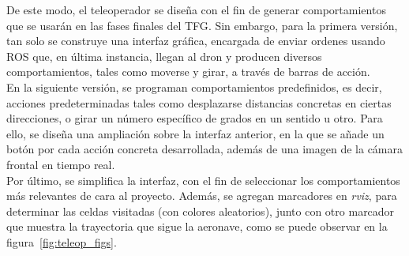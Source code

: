 De este modo, el teleoperador se diseña con el fin de generar comportamientos que se usarán en las fases finales del \ac{TFG}. Sin embargo, para la primera versión, tan solo se construye una interfaz gráfica, encargada de enviar ordenes usando \ac{ROS} que, en última instancia, llegan al dron y producen diversos comportamientos, tales como moverse y girar, a través de barras de acción.\\

En la siguiente versión, se programan comportamientos predefinidos, es decir, acciones predeterminadas tales como desplazarse distancias concretas en ciertas direcciones, o girar un número específico de grados en un sentido u otro. Para ello, se diseña una ampliación sobre la interfaz anterior, en la que se añade un botón por cada acción concreta desarrollada, además de una imagen de la cámara frontal en tiempo real.\\

Por último, se simplifica la interfaz, con el fin de seleccionar los comportamientos más relevantes de cara al proyecto. Además, se agregan marcadores en \emph{rviz}, para determinar las celdas visitadas (con colores aleatorios), junto con otro marcador que muestra la trayectoria que sigue la aeronave, como se puede observar en la figura~\ref{fig:teleop_figs}.\\

